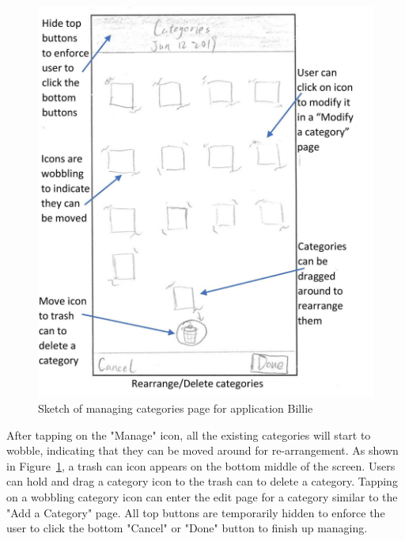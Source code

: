 \documentclass{sigchi}
\begin{document}
\begin{figure}[h!]
\centering
  \includegraphics[width=0.6\columnwidth]{17-re-arrange-category-page.jpg}
  \caption{Sketch of managing categories page for application Billie}
  \label{fig:figure32}
\end{figure}
After tapping on the "Manage" icon, all the existing categories will start to wobble, indicating that they can be moved around for re-arrangement. As shown in Figure~\ref{fig:figure32}, a trash can icon appears on the bottom middle of the screen. Users can hold and drag a category icon to the trash can to delete a category. Tapping on a wobbling category icon can enter the edit page for a category similar to the "Add a Category" page. All top buttons are temporarily hidden to enforce the user to click the bottom "Cancel" or "Done" button to finish up managing.
\end{document}
